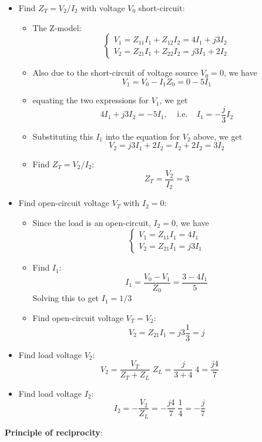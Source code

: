 \begin{itemize}
\begin{itemize}
\item Find $Z_T=V_2/I_2$ with voltage $V_0$ short-circuit:
  \begin{itemize}
  \item The Z-model:
    \[
    \left\{ \begin{array}{l} V_1=Z_{11}I_1+Z_{12}I_2=4I_1+j3I_2	\\
      V_2=Z_{21}I_1+Z_{22}I_2=j3I_1+2I_2 \end{array} \right. 
    \]
  \item Also due to the short-circuit of voltage source $V_0=0$, we have
    \[
    V_1=V_0-I_1 Z_0=0-5I_1	
    \]
  \item equating the two expressions for $V_1$, we get
    \[
    4I_1+j3I_2=-5I_1,\;\;\;\;\mbox{i.e.}\;\;\;\;I_1=-\frac{j}{3} I_2	
    \]
  \item Substituting this $I_1$ into the equation for $V_2$ above, we get
    \[
    V_2=j3I_1+2I_2=I_2+2I_2=3I_2 
    \]
  \item Find $Z_T=V_2/I_2$:
    \[
    Z_T=\frac{V_2}{I_2}=3	
    \]
  \end{itemize}
\item Find open-circuit voltage $V_T$ with $I_2=0$:
  \begin{itemize}
  \item Since the load is an open-circuit, $I_2=0$, we have
    \[ 
    \left\{ \begin{array}{l} V_1=Z_{11}I_1=4I_1 \\
      V_2=Z_{21}I_1=j3 I_1 \end{array} \right. 
    \]
  \item Find $I_1$:
    \[
    I_1=\frac{V_0-V_1}{Z_0}=\frac{3-4I_1}{5}	
    \]
    Solving this to get $I_1=1/3$
  \item Find open-circuit voltage $V_T=V_2$:
    \[
    V_2=Z_{21}I_1=j3 \frac{1}{3}=j	
    \]
  \end{itemize}
\item Find load voltage $V_2$:
  \[
  V_2=\frac{V_T}{Z_T+Z_L}\;Z_L=\frac{j}{3+4}\;4=\frac{j4}{7} 
  \]
\item Find load voltage $I_2$:
  \[
  I_2=-\frac{V_2}{Z_L}=-\frac{j4}{7}\;\frac{1}{4}=-\frac{j}{7} 
  \]
\end{itemize}


{\bf Principle of reciprocity}:
 


\end{itemize}
